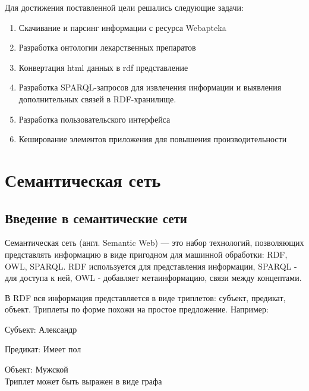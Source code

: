 \documentclass[specialist,subf,href,colorlinks=true
]{disser}
\begin{document}
Для достижения поставленной цели решались следующие задачи:
\begin{enumerate}
\item Скачивание и парсинг информации с ресурса Webapteka
\item Разработка онтологии лекарственных препаратов
\item Конвертация html данных в rdf представление
\item Разработка SPARQL-запросов для извлечения информации и выявления дополнительных связей в RDF-хранилище.
\item Разработка пользовательского интерфейса
\item Кеширование элементов приложения для повышения производительности
\end{enumerate}

\chapter{Семантическая сеть}
\section{Введение в семантические сети}

Семантическая сеть (англ. Semantic Web) — это набор технологий, позволяющих представлять информацию в виде пригодном для машинной обработки: RDF, OWL, SPARQL. RDF используется для представления информации, SPARQL - для доступа к ней, OWL - добавляет метаинформацию, связи между концептами.

В RDF вся информация представляется в виде триплетов: субъект, предикат, объект. Триплеты по форме похожи на простое предложение.  Например:
\par Субъект: Александр
\par Предикат: Имеет пол
\par Объект: Мужской
\\Триплет может быть выражен в виде графа
\\
\par {}
\end{document}

